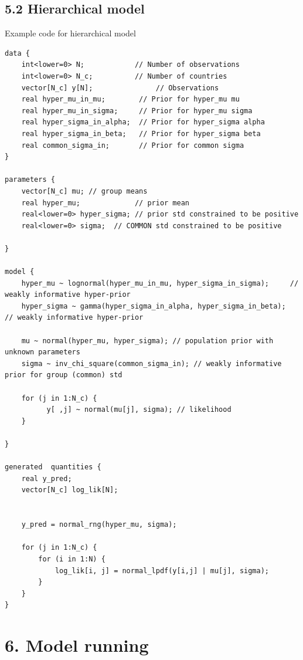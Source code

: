 \documentclass[
]{article}
\begin{document}
\hypertarget{hierarchical-model}{%
\subsection{5.2 Hierarchical model}\label{hierarchical-model}}

Example code for hierarchical model

\begin{verbatim}
data {
    int<lower=0> N;            // Number of observations
    int<lower=0> N_c;          // Number of countries
    vector[N_c] y[N];               // Observations
    real hyper_mu_in_mu;        // Prior for hyper_mu mu
    real hyper_mu_in_sigma;     // Prior for hyper_mu sigma
    real hyper_sigma_in_alpha;  // Prior for hyper_sigma alpha
    real hyper_sigma_in_beta;   // Prior for hyper_sigma beta
    real common_sigma_in;       // Prior for common sigma
}

parameters {
    vector[N_c] mu; // group means
    real hyper_mu;             // prior mean
    real<lower=0> hyper_sigma; // prior std constrained to be positive
    real<lower=0> sigma;  // COMMON std constrained to be positive
    
}

model {
    hyper_mu ~ lognormal(hyper_mu_in_mu, hyper_sigma_in_sigma);     // weakly informative hyper-prior
    hyper_sigma ~ gamma(hyper_sigma_in_alpha, hyper_sigma_in_beta);   // weakly informative hyper-prior
    
    mu ~ normal(hyper_mu, hyper_sigma); // population prior with unknown parameters   
    sigma ~ inv_chi_square(common_sigma_in); // weakly informative prior for group (common) std
    
    for (j in 1:N_c) {
          y[ ,j] ~ normal(mu[j], sigma); // likelihood
    }
    
}

generated  quantities {
    real y_pred;
    vector[N_c] log_lik[N];
    
    
    y_pred = normal_rng(hyper_mu, sigma);
    
    for (j in 1:N_c) {
        for (i in 1:N) {
            log_lik[i, j] = normal_lpdf(y[i,j] | mu[j], sigma);
        }
    }
}
\end{verbatim}

\hypertarget{model-running}{%
\section{6. Model running}\label{model-running}}
\end{document}

